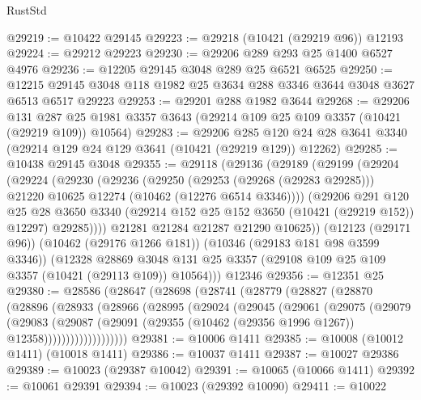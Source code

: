\begin{lexlean}{RustStd}
\begin{coremodule}
@29219 := @10422 @29145
@29223 := @29218 (@10421 (@29219 @96)) @12193
@29224 := @29212 @29223
@29230 := @29206 @289 @293 @25 @1400 @6527 @4976
@29236 := @12205 @29145 @3048 @289 @25 @6521 @6525
@29250 := @12215 @29145 @3048 @118 @1982 @25 @3634 @288 @3346 @3644 @3048 @3627 @6513 @6517 @29223
@29253 := @29201 @288 @1982 @3644
@29268 := @29206
    @131
    @287
    @25
    @1981
    @3357
    @3643
    (@29214 @109 @25 @109 @3357 (@10421 (@29219 @109)) @10564)
@29283 := @29206
    @285
    @120
    @24
    @28
    @3641
    @3340
    (@29214 @129 @24 @129 @3641 (@10421 (@29219 @129)) @12262)
@29285 := @10438 @29145 @3048
@29355 := @29118
    (@29136
      (@29189
        (@29199
          (@29204
            (@29224
              (@29230
                (@29236
                  (@29250
                    (@29253 (@29268 (@29283 @29285)))
                    @21220
                    @10625
                    @12274
                    (@10462 (@12276 @6514 @3346))))
                (@29206
                  @291
                  @120
                  @25
                  @28
                  @3650
                  @3340
                  (@29214 @152 @25 @152 @3650 (@10421 (@29219 @152)) @12297)
                  @29285))))
          @21281
          @21284
          @21287
          @21290
          @10625))
      (@12123 (@29171 @96))
      (@10462 (@29176 @1266 @181))
      (@10346 (@29183 @181 @98 @3599 @3346))
      (@12328
        @28869
        @3048
        @131
        @25
        @3357
        (@29108 @109 @25 @109 @3357 (@10421 (@29113 @109)) @10564)))
    @12346
@29356 := @12351 @25
@29380 := @28586
    (@28647
      (@28698
        (@28741
          (@28779
            (@28827
              (@28870
                (@28896
                  (@28933
                    (@28966
                      (@28995
                        (@29024
                          (@29045
                            (@29061
                              (@29075
                                (@29079
                                  (@29083
                                    (@29087
                                      (@29091
                                        (@29355
                                          (@10462 (@29356 @1996 @1267))
                                          @12358)))))))))))))))))))
@29381 := @10006 @1411
@29385 := @10008 (@10012 @1411) (@10018 @1411)
@29386 := @10037 @1411
@29387 := @10027 @29386
@29389 := @10023 (@29387 @10042)
@29391 := @10065 (@10066 @1411)
@29392 := @10061 @29391
@29394 := @10023 (@29392 @10090)
@29411 := @10022

\end{coremodule}
\end{lexlean}
